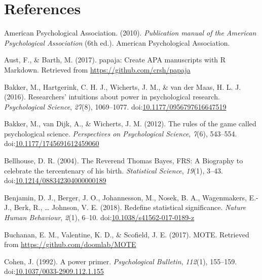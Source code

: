 \documentclass[,man, mask]{apa6}
\theoremstyle{definition}
\theoremstyle{definition}
\theoremstyle{definition}
\theoremstyle{remark}
\begin{document}
\newpage

\section{References}\label{references}

\setlength{\parindent}{-0.5in} \setlength{\leftskip}{0.5in}

\hypertarget{refs}{}
\hypertarget{ref-AmericanPsychologicalAssociation2010}{}
American Psychological Association. (2010). \emph{Publication manual of
the American Psychological Association} (6th ed.). American
Psychological Association.

\hypertarget{ref-Aust2017}{}
Aust, F., \& Barth, M. (2017). papaja: Create APA manuscripts with R
Markdown. Retrieved from \url{https://github.com/crsh/papaja}

\hypertarget{ref-Bakker2016}{}
Bakker, M., Hartgerink, C. H. J., Wicherts, J. M., \& van der Maas, H.
L. J. (2016). Researchers' intuitions about power in psychological
research. \emph{Psychological Science}, \emph{27}(8), 1069--1077.
doi:\href{https://doi.org/10.1177/0956797616647519}{10.1177/0956797616647519}

\hypertarget{ref-Bakker2012}{}
Bakker, M., van Dijk, A., \& Wicherts, J. M. (2012). The rules of the
game called psychological science. \emph{Perspectives on Psychological
Science}, \emph{7}(6), 543--554.
doi:\href{https://doi.org/10.1177/1745691612459060}{10.1177/1745691612459060}

\hypertarget{ref-Bellhouse2004}{}
Bellhouse, D. R. (2004). The Reverend Thomas Bayes, FRS: A Biography to
celebrate the tercentenary of his birth. \emph{Statistical Science},
\emph{19}(1), 3--43.
doi:\href{https://doi.org/10.1214/088342304000000189}{10.1214/088342304000000189}

\hypertarget{ref-Benjamin2017}{}
Benjamin, D. J., Berger, J. O., Johannesson, M., Nosek, B. A.,
Wagenmakers, E.-J., Berk, R., \ldots{} Johnson, V. E. (2018). Redefine
statistical significance. \emph{Nature Human Behaviour}, \emph{2}(1),
6--10.
doi:\href{https://doi.org/10.1038/s41562-017-0189-z}{10.1038/s41562-017-0189-z}

\hypertarget{ref-Buchanan2017}{}
Buchanan, E. M., Valentine, K. D., \& Scofield, J. E. (2017). MOTE.
Retrieved from \url{https://github.com/doomlab/MOTE}

\hypertarget{ref-Cohen1992a}{}
Cohen, J. (1992). A power primer. \emph{Psychological Bulletin},
\emph{112}(1), 155--159.
doi:\href{https://doi.org/10.1037/0033-2909.112.1.155}{10.1037/0033-2909.112.1.155}
\end{document}
